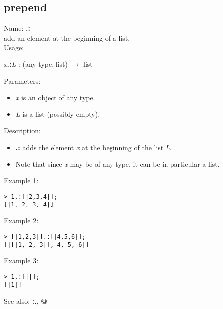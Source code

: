 \subsection{ prepend }
\noindent Name: \textbf{.:}\\
add an element at the beginning of a list.\\

\noindent Usage: 
\begin{center}
\emph{x}\textbf{.:}\emph{L} : (\textsf{any type}, \textsf{list}) $\rightarrow$ \textsf{list}\\
\end{center}
Parameters: 
\begin{itemize}
\item \emph{x} is an object of any type.
\item \emph{L} is a list (possibly empty).
\end{itemize}
\noindent Description: \begin{itemize}

\item \textbf{.:} adds the element \emph{x} at the beginning of the list \emph{L}.

\item Note that since \emph{x} may be of any type, it can be in particular a list.
\end{itemize}
\noindent Example 1: 
\begin{center}\begin{minipage}{15cm}\begin{Verbatim}[frame=single]
> 1.:[|2,3,4|];
[|1, 2, 3, 4|]
\end{Verbatim}
\end{minipage}\end{center}
\noindent Example 2: 
\begin{center}\begin{minipage}{15cm}\begin{Verbatim}[frame=single]
> [|1,2,3|].:[|4,5,6|];
[|[|1, 2, 3|], 4, 5, 6|]
\end{Verbatim}
\end{minipage}\end{center}
\noindent Example 3: 
\begin{center}\begin{minipage}{15cm}\begin{Verbatim}[frame=single]
> 1.:[||];
[|1|]
\end{Verbatim}
\end{minipage}\end{center}
See also: \textbf{:.}, \textbf{@}
